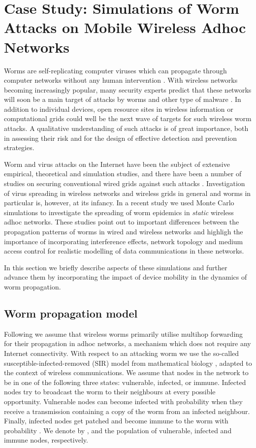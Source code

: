 \documentclass{elsart}
\begin{document}
\section{Case Study: Simulations of Worm Attacks on Mobile 
Wireless Adhoc Networks}
Worms are self-replicating computer viruses which can propagate through 
computer networks without any human intervention \cite{book-virus}.
With wireless networks becoming increasingly popular, many 
security experts predict that these networks will soon be a main 
target of attacks by worms and other type of malware \cite{sci-am,nature}.
In addition to individual devices, open resource sites in wireless information 
or computational grids could well be the next wave of targets for such 
wireless worm attacks. A qualitative understanding of such attacks is of great 
importance, both in assessing their risk and for the 
design of effective detection and prevention strategies. 

Worm and virus attacks on the Internet have been the subject of extensive 
empirical, theoretical and simulation studies, and there have been a 
number of studies on securing  conventional wired grids against such  attacks
\cite{wisec}.  Investigation of virus spreading in 
wireless networks and wireless grids in general and worms 
in particular is, however, at its infancy. 
In a recent study \cite{maziar-worms} 
we used Monte Carlo simulations to investigate 
the spreading of worm epidemics in {\it static} wireless adhoc networks.
These studies point out to important differences 
between the propagation patterns of worms in wired and wireless networks
and highligh the importance of incorporating interference effects, 
network topology and medium access control for realistic 
modelling of data communications in these networks.

In this section we briefly describe aspects of these simulations 
and further advance them by incorporating the impact of device 
mobility in the dynamics of worm propagation. 

\subsection{Worm propagation model}
Following \cite{maziar-worms} we assume that wireless 
worms primarily utilise multihop forwarding for their propagation in adhoc
 networks, a mechanism which does not require any Internet connectivity.  
With respect to an attacking  worm we use the so-called 
susceptible-infected-removed (SIR) model from mathematical 
biology \cite{bio}, adapted to the context of wireless communications.
We assume that nodes in the network to 
be in one of the  following three states: vulnerable,
infected, or  immune. Infected nodes try to broadcast the worm to their
neighbours at every possible opportunity.
Vulnerable nodes can become infected with probability  
 when they receive a transmission containing a
copy  of the worm  from an infected neighbour. Finally, infected 
nodes get patched and become immune to the worm with 
probability  . We denote by ,  and  the 
population of vulnerable, infected and immune nodes, respectively.
\end{document}
